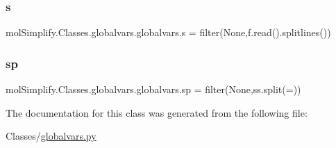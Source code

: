\subsubsection{\texorpdfstring{s}{s}}
{\footnotesize\ttfamily mol\+Simplify.\+Classes.\+globalvars.\+globalvars.\+s = filter(None,f.\+read().splitlines())\hspace{0.3cm}{\ttfamily [static]}}

\mbox{\label{classmolSimplify_1_1Classes_1_1globalvars_1_1globalvars_ac751358fbd2e3facd739964f49c58a26}} 
\subsubsection{\texorpdfstring{sp}{sp}}
{\footnotesize\ttfamily mol\+Simplify.\+Classes.\+globalvars.\+globalvars.\+sp = filter(None,ss.\+split(\textquotesingle{}=\textquotesingle{}))\hspace{0.3cm}{\ttfamily [static]}}



The documentation for this class was generated from the following file\+:\begin{DoxyCompactItemize}
\item 
Classes/\hyperlink{globalvars_8py}{globalvars.\+py}\end{DoxyCompactItemize}
